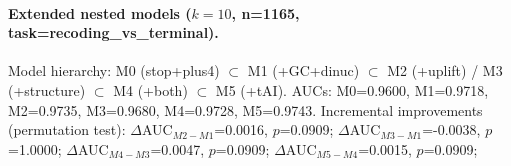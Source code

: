 \paragraph{Extended nested models ($k=10$, n=1165, task=recoding_vs_terminal).}
Model hierarchy: M0 (stop+plus4) $\subset$ M1 (+GC+dinuc) $\subset$ M2 (+uplift) / M3 (+structure) $\subset$ M4 (+both) $\subset$ M5 (+tAI).
AUCs: M0=0.9600, M1=0.9718, M2=0.9735, M3=0.9680, M4=0.9728, M5=0.9743.
Incremental improvements (permutation test):
  $\Delta$AUC$_{M2-M1}$=0.0016, $p$=0.0909;
  $\Delta$AUC$_{M3-M1}$=-0.0038, $p$=1.0000;
  $\Delta$AUC$_{M4-M3}$=0.0047, $p$=0.0909;
  $\Delta$AUC$_{M5-M4}$=0.0015, $p$=0.0909;
